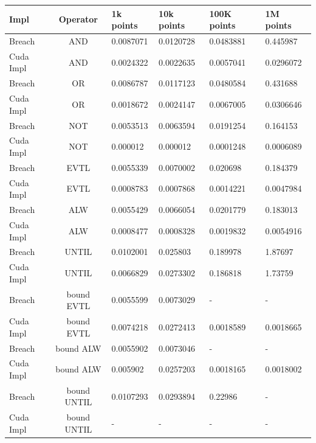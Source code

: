 \documentclass[a4paper,10pt]{article}
\begin{document}
\begin{center}
	\begin{tabular}{| l | c || l | l | l | l |}
	    \hline
	    Impl & Operator & 1k points & 10k points & 100K points & 1M points \\
	    \hline \hline
	    Breach & AND & 0.0087071 & 0.0120728 & 0.0483881 & 0.445987 \\
	    Cuda Impl & AND & 0.0024322 & 0.0022635 & 0.0057041 & 0.0296072 \\
	    \hline \hline
	    Breach & OR & 0.0086787 & 0.0117123 & 0.0480584 & 0.431688 \\
	    Cuda Impl & OR & 0.0018672 & 0.0024147 & 0.0067005 & 0.0306646 \\
	    \hline \hline   
	    Breach & NOT & 0.0053513 & 0.0063594 & 0.0191254 & 0.164153 \\
	    Cuda Impl & NOT & 0.000012 & 0.000012 & 0.0001248 & 0.0006089 \\
	    \hline \hline   
        Breach & EVTL & 0.0055339 & 0.0070002 & 0.020698 & 0.184379 \\
        Cuda Impl & EVTL & 0.0008783 & 0.0007868 & 0.0014221 & 0.0047984 \\
	    \hline \hline   
        Breach & ALW & 0.0055429 & 0.0066054 & 0.0201779 & 0.183013 \\
        Cuda Impl & ALW & 0.0008477 & 0.0008328 & 0.0019832 & 0.0054916 \\
	    \hline \hline   
        Breach & UNTIL & 0.0102001 & 0.025803 & 0.189978 & 1.87697 \\
        Cuda Impl & UNTIL & 0.0066829 & 0.0273302 & 0.186818 & 1.73759 \\        
	    \hline \hline   
        Breach & bound EVTL & 0.0055599 & 0.0073029 & - & - \\
        Cuda Impl & bound EVTL & 0.0074218 & 0.0272413 & 0.0018589 & 0.0018665 \\        
	    \hline \hline   
        Breach & bound ALW & 0.0055902 & 0.0073046 & - & - \\
        Cuda Impl & bound ALW & 0.005902 & 0.0257203 & 0.0018165 & 0.0018002 \\        
	    \hline \hline   
        Breach & bound UNTIL & 0.0107293 & 0.0293894 & 0.22986 & - \\
        Cuda Impl & bound UNTIL & - & - & - & - \\        
	    \hline
	\end{tabular}
	\label{tab: bechmark results signal type1}
\end{center}
\end{document}
